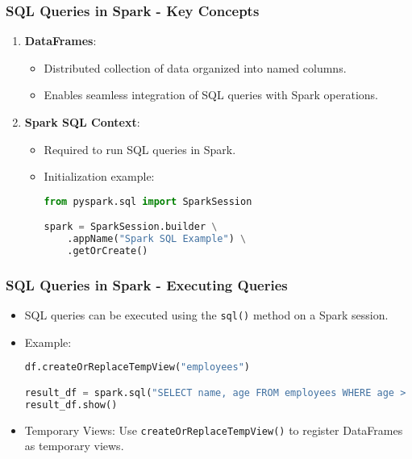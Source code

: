 \documentclass[aspectratio=169]{beamer}
\begin{document}
\begin{frame}[fragile]
    \frametitle{SQL Queries in Spark - Key Concepts}
    \begin{enumerate}
        \item \textbf{DataFrames}:
        \begin{itemize}
            \item Distributed collection of data organized into named columns.
            \item Enables seamless integration of SQL queries with Spark operations.
        \end{itemize}
        
        \item \textbf{Spark SQL Context}:
        \begin{itemize}
            \item Required to run SQL queries in Spark.
            \item Initialization example:
            \begin{lstlisting}[language=Python]
from pyspark.sql import SparkSession

spark = SparkSession.builder \
    .appName("Spark SQL Example") \
    .getOrCreate()
            \end{lstlisting}
        \end{itemize}
    \end{enumerate}
\end{frame}

\begin{frame}[fragile]
    \frametitle{SQL Queries in Spark - Executing Queries}
    \begin{itemize}
        \item SQL queries can be executed using the \texttt{sql()} method on a Spark session.
        \item Example:
        \begin{lstlisting}[language=Python]
df.createOrReplaceTempView("employees")

result_df = spark.sql("SELECT name, age FROM employees WHERE age > 30")
result_df.show()
        \end{lstlisting}
        \item Temporary Views: Use \texttt{createOrReplaceTempView()} to register DataFrames as temporary views.
    \end{itemize}
\end{frame}
\end{document}
